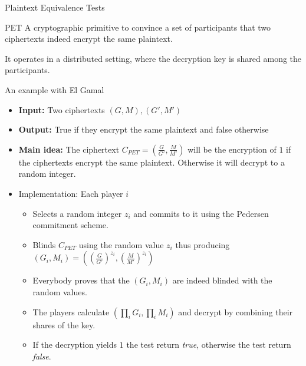 \documentclass{beamer}
\begin{document}
\begin{frame}[allowframebreaks]{Plaintext Equivalence Tests}

\begin{block}{PET}
A cryptographic primitive  to convince a set of participants that two ciphertexts indeed encrypt the same plaintext. 

It operates in a distributed setting, where the decryption key is shared among the participants.
\end{block}

\begin{block}{An example with El Gamal}
\begin{itemize}
\item \textbf{Input:} Two ciphertexts $(G, M), (G', M')$
\item \textbf{Output:}  True if they encrypt the same plaintext and false otherwise
\item \textbf{Main idea:} The ciphertext $C_{PET} = (\frac{G}{G'}, \frac{M}{M'})$ will be the encryption of $1$ if the ciphertexts encrypt the same plaintext. Otherwise it will decrypt to a random integer.
\item Implementation: Each player $i$
\begin{itemize}
\item Selects a random integer $z_i$ and commits to it using the Pedersen commitment scheme.
\item Blinds $C_{PET}$ using the random value $z_i$ thus producing $(G_i, M_i) = ((\frac{G}{G'})^{z_i}, (\frac{M}{M'})^{z_i})$
\item Everybody proves that the $(G_i, M_i)$ are indeed blinded with the random values.
\item The players calculate $(\prod_i G_i, \prod_i M_i)$ and decrypt by combining their shares of the key.
\item If the decryption yields $1$ the test return \textit{true}, otherwise the test return \textit{false}.
\end{itemize}
\end{itemize}
\end{block}
 
\end{frame}
\end{document}
